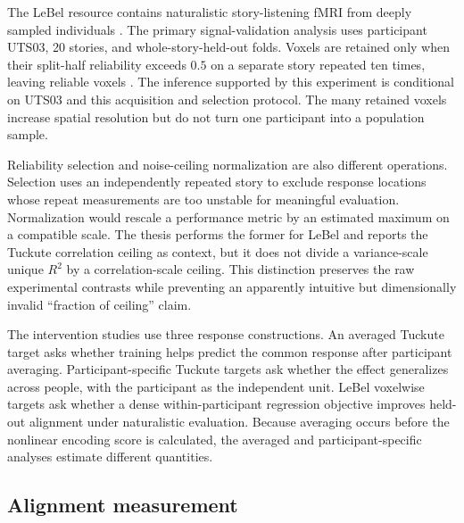 The LeBel resource contains naturalistic story-listening fMRI from deeply sampled individuals \autocite{lebel2023}.
The primary signal-validation analysis uses participant UTS03, 20 stories, and whole-story-held-out folds.
Voxels are retained only when their split-half reliability exceeds $0.5$ on a separate story repeated ten times, leaving  reliable voxels .
The inference supported by this experiment is conditional on UTS03 and this acquisition and selection protocol.
The many retained voxels increase spatial resolution but do not turn one participant into a population sample.

Reliability selection and noise-ceiling normalization are also different operations.
Selection uses an independently repeated story to exclude response locations whose repeat measurements are too unstable for meaningful evaluation.
Normalization would rescale a performance metric by an estimated maximum on a compatible scale.
The thesis performs the former for LeBel and reports the Tuckute correlation ceiling as context, but it does not divide a variance-scale unique $R^2$ by a correlation-scale ceiling.
This distinction preserves the raw experimental contrasts while preventing an apparently intuitive but dimensionally invalid ``fraction of ceiling'' claim.

The intervention studies use three response constructions.
An averaged Tuckute target asks whether training helps predict the common response after participant averaging.
Participant-specific Tuckute targets ask whether the effect generalizes across people, with the participant as the independent unit.
LeBel voxelwise targets ask whether a dense within-participant regression objective improves held-out alignment under naturalistic evaluation.
Because averaging occurs before the nonlinear encoding score is calculated, the averaged and participant-specific analyses estimate different quantities.

\subsection{Alignment measurement}


